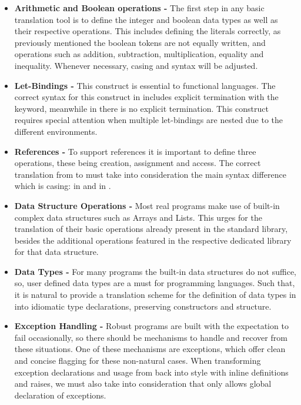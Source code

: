 \begin{itemize}

\item \textbf{Arithmetic and Boolean operations -} The first step in any basic translation tool is to define the integer and boolean 
data types as well as their respective operations.
This includes defining the literals correctly, as previously mentioned the boolean tokens are not equally written, and operations
such as addition, subtraction, multiplication, equality and inequality. Whenever necessary, casing and syntax will be adjusted.

\item \textbf{Let-Bindings -} This construct is essential to functional languages. The correct syntax for this construct in 
\cml includes explicit 
termination with the  keyword, meanwhile in \ocaml there is no explicit termination. This construct requires 
special attention when multiple let-bindings are nested due to the different environments.

\item \textbf{References -} To support references it is important to define three operations, these being creation, assignment and 
access. The correct translation
from \cml to \ocaml must take into consideration the main syntax difference which is casing:  in \ocaml
and  in \cml.

\item \textbf{Data Structure Operations -} Most real programs make use of built-in complex data structures such as Arrays and Lists. 
This urges for the translation of their 
basic operations already present in the standard library, besides the additional operations featured in the respective dedicated 
library for that data structure.

\item \textbf{Data Types -} For many programs the built-in data structures do not suffice, so, user defined data types are a must 
for programming languages.
Such that, it is natural to provide a translation scheme for the definition of data types in \cml into idiomatic \ocaml type declarations, 
preserving constructors and structure.

\item \textbf{Exception Handling -} Robust programs are built with the expectation to fail occasionally, so there should 
be mechanisms to handle and recover from these 
situations. One of these mechanisms are exceptions, which offer clean and concise flagging for these non-natural cases.
When transforming exception declarations and usage from \cml back into \ocaml style with inline definitions and raises, we must also take
into consideration that \cml only allows global declaration of exceptions.

\end{itemize}

